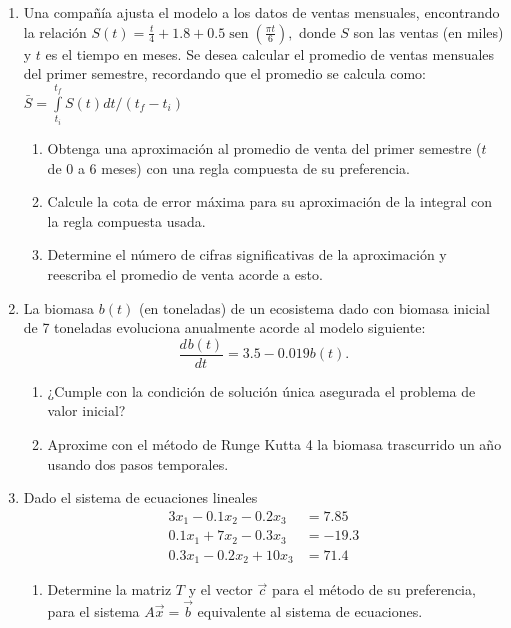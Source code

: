 \documentclass[12pt]{article}
\renewcommand{\sin}{\operatorname{sen}}
\newcommand{\diff}[3]{\frac{d^{#3} #1}{d#2^{#3}}}
\begin{document}
\vspace{-.5cm}
  \begin{enumerate}[leftmargin=*,widest=9]
    \item Una compañía ajusta el modelo a los datos de ventas mensuales, encontrando la relación
    \( S(t)= \frac{t}{4}+1.8+0.5\sin\left( \frac{\pi t}{6} \right),
    \)
    donde \(S\) son las ventas (en miles) y \(t\) es el tiempo en meses. Se desea calcular el promedio de ventas mensuales del primer semestre, recordando que el promedio se calcula como:
    \(
    \bar{S} = \int\limits_{t_i}^{t_f}S(t)dt /(t_f - t_i)
    \)
    \begin{enumerate}[label=\alph*]
    \item Obtenga una aproximación al promedio de venta del primer semestre (\(t\) de 0 a 6 meses) con una regla compuesta de su preferencia.
    \item Calcule la cota de error máxima para su aproximación de la integral con la regla compuesta usada.
    \item Determine el número de cifras significativas de la aproximación y reescriba el promedio de venta acorde a esto.
    \end{enumerate}
    \item La biomasa \(b(t)\) (en toneladas) de un ecosistema dado con biomasa inicial de 7 toneladas evoluciona anualmente acorde al modelo siguiente:
    \[
\diff{b(t)}{t}{} = 3.5 - 0.019b(t).
    \]
    \begin{enumerate}[label=\alph*]
    \item ¿Cumple con la condición de solución única asegurada el problema de valor inicial?
    \item Aproxime con el método de Runge Kutta 4 la biomasa trascurrido un año usando dos pasos temporales.
\end{enumerate}
   \item Dado el sistema de ecuaciones lineales
   \begin{align*}
   3x_1 - 0.1x_2 - 0.2x_3 & = 7.85 \\
   0.1x_1 + 7x_2 - 0.3x_3 & = -19.3 \\
   0.3x_1 - 0.2x_2 + 10x_3 & = 71.4
   \end{align*}
   \begin{enumerate}[label=\alph*]
   \item Determine la matriz \(T\) y el vector \(\vec{c}\) para el método de su preferencia, para el sistema \(A\vec{x}=\vec{b}\) equivalente al sistema de ecuaciones.

\end{enumerate}
\end{enumerate}
\end{document}
